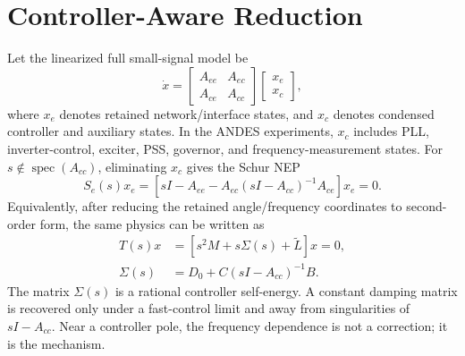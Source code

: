 \documentclass[conference]{IEEEtran}
\newcommand{\spec}{\operatorname{spec}}
\begin{document}
\section{Controller-Aware Reduction}

Let the linearized full small-signal model be
\begin{equation}
  \dot x =
  \begin{bmatrix}
    A_{ee} & A_{ec}\\
    A_{ce} & A_{cc}
  \end{bmatrix}
  \begin{bmatrix}x_e\\x_c\end{bmatrix},
  \label{eq:partition}
\end{equation}
where $x_e$ denotes retained network/interface states, and $x_c$ denotes condensed controller and auxiliary states. In the ANDES experiments, $x_c$ includes PLL, inverter-control, exciter, PSS, governor, and frequency-measurement states. For $s\notin\spec(A_{cc})$, eliminating $x_c$ gives the Schur NEP
\begin{equation}
  S_e(s)x_e =
  \left[sI-A_{ee}-A_{ec}(sI-A_{cc})^{-1}A_{ce}\right]x_e =0 .
  \label{eq:schur}
\end{equation}
Equivalently, after reducing the retained angle/frequency coordinates to second-order form, the same physics can be written as
\begin{equation}
  \begin{aligned}
  T(s)x&=\left[s^2M+s\Sigma(s)+\widetilde L\right]x=0,\\
  \Sigma(s)&=D_0+C(sI-A_{cc})^{-1}B .
  \end{aligned}
  \label{eq:selfenergy}
\end{equation}
The matrix $\Sigma(s)$ is a rational controller self-energy. A constant damping matrix is recovered only under a fast-control limit and away from singularities of $sI-A_{cc}$. Near a controller pole, the frequency dependence is not a correction; it is the mechanism.
\end{document}
